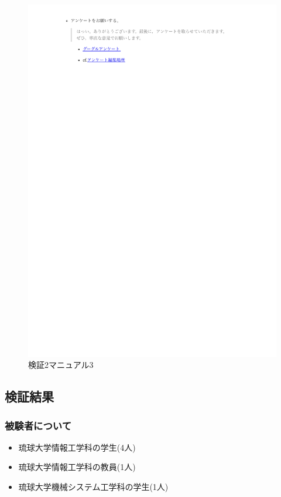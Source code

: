     \vspace{4cm}%
    \begin{figure}[H]
        \includegraphics[width=15cm]{./fig/chapter4/inspect_2/manual/manual_3.pdf}
        \caption{検証2マニュアル3}
        \label{検証２マニュアル３}
    \end{figure}



\subsection{検証結果}
    \subsubsection{被験者について}
    \begin{itemize}
        \item 琉球大学情報工学科の学生(4人)
        \item 琉球大学情報工学科の教員(1人)
        \item 琉球大学機械システム工学科の学生(1人)
    \end{itemize}

